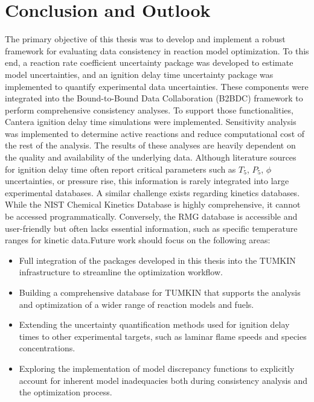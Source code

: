 \chapter{Conclusion and Outlook}\label{Chap:Conclusion}The primary objective of this thesis was to develop and implement a robust framework for evaluating data consistency in reaction model optimization. To this end, a reaction rate coefficient uncertainty package was developed to estimate model uncertainties, and an ignition delay time uncertainty package was implemented to quantify experimental data uncertainties. These components were integrated into the Bound-to-Bound Data Collaboration (B2BDC) framework to perform comprehensive consistency analyses. To support those functionalities, Cantera ignition delay time simulations were implemented. Sensitivity analysis was implemented to determine active reactions and reduce computational cost of the rest of the analysis. The results of these analyses are heavily dependent on the quality and availability of the underlying data. Although literature sources for ignition delay time often report critical parameters such as $T_5$, $P_5$, $\phi$ uncertainties, or pressure rise, this information is rarely integrated into large experimental databases. A similar challenge exists regarding kinetics databases. While the NIST Chemical Kinetics Database \cite{j_a_manion_r_e_huie_r_d_levin_d_r_burgess_jr_v_l_orkin_w_tsang_w_s_mcgivern_j_w_hudgens_v_d_knyazev_d_b_atkinson_e_chai_a_m_tereza_c-y_lin_t_c_allison_w_g_mallard_f_westley_j_t_herron_r_f_hampson_and_d_h_frizzell_nist_nodate} is highly comprehensive, it cannot be accessed programmatically. Conversely, the RMG database \cite{johnson_rmg_2022-1} is accessible and user-friendly but often lacks essential information, such as specific temperature ranges for kinetic data.Future work should focus on the following areas:\begin{itemize}\item Full integration of the packages developed in this thesis into the TUMKIN infrastructure to streamline the optimization workflow.\item Building a comprehensive database for TUMKIN that supports the analysis and optimization of a wider range of reaction models and fuels.\item Extending the uncertainty quantification methods used for ignition delay times to other experimental targets, such as laminar flame speeds and species concentrations.\item Exploring the implementation of model discrepancy functions to explicitly account for inherent model inadequacies both during consistency analysis and the optimization process.\end{itemize}







